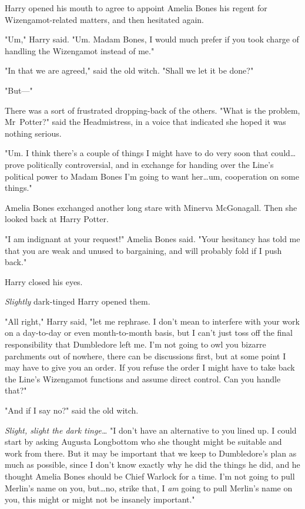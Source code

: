 Harry opened his mouth to agree to appoint Amelia Bones his regent for
Wizengamot-related matters, and then hesitated again.

"Um," Harry said. "Um. Madam Bones, I would much prefer if you took charge of
handling the Wizengamot instead of me."

"In that we are agreed," said the old witch. "Shall we let it be done?"

"But---"

There was a sort of frustrated dropping-back of the others. "What is the
problem, Mr~Potter?" said the Headmistress, in a voice that indicated she
hoped it was nothing serious.

"Um. I think there's a couple of things I might have to do very soon that
could…prove politically controversial, and in exchange for handing over
the Line's political power to Madam Bones I'm going to want her…um,
cooperation on some things."

Amelia Bones exchanged another long stare with Minerva McGonagall. Then she
looked back at Harry Potter.

"I am indignant at your request!" Amelia Bones said. "Your hesitancy has told
me that you are weak and unused to bargaining, and will probably fold if I push
back."

Harry closed his eyes.

\emph{Slightly} dark-tinged Harry opened them.

"All right," Harry said, "let me rephrase. I don't mean to interfere with your
work on a day-to-day or even month-to-month basis, but I can't just toss off
the final responsibility that Dumbledore left me. I'm not going to owl you
bizarre parchments out of nowhere, there can be discussions first, but at some
point I may have to give you an order. If you refuse the order I might have to
take back the Line's Wizengamot functions and assume direct control. Can you
handle that?"

"And if I say no?" said the old witch.

\emph{Slight, slight the dark tinge…} "I don't have an alternative to
you lined up. I could start by asking Augusta Longbottom who she thought might
be suitable and work from there. But it may be important that we keep to
Dumbledore's plan as much as possible, since I don't know exactly why he did
the things he did, and he thought Amelia Bones should be Chief Warlock for a
time. I'm not going to pull Merlin's name on you, but…no, strike that,
I \emph{am} going to pull Merlin's name on you, this might or might not be
insanely important."

